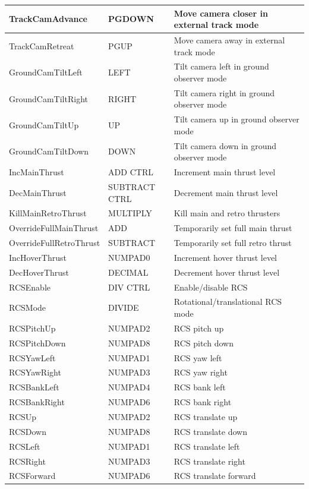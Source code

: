 \documentclass[Orbiter User Manual.tex]{subfiles}
\begin{document}
\begin{longtable}{ p{} p{} p{} }
	\hline
	TrackCamAdvance & PGDOWN & Move camera closer in external track mode\\
	\hline
	TrackCamRetreat & PGUP & Move camera away in external track mode\\
	\hline
	GroundCamTiltLeft & LEFT & Tilt camera left in ground observer mode\\
	\hline
	GroundCamTiltRight & RIGHT & Tilt camera right in ground observer mode\\
	\hline
	GroundCamTiltUp & UP & Tilt camera up in ground observer mode\\
	\hline
	GroundCamTiltDown & DOWN & Tilt camera down in ground observer mode\\
	\hline
	IncMainThrust & ADD CTRL & Increment main thrust level\\
	\hline
	DecMainThrust & SUBTRACT CTRL & Decrement main thrust level\\
	\hline
	KillMainRetroThrust & MULTIPLY & Kill main and retro thrusters\\
	\hline
	OverrideFullMainThrust & ADD & Temporarily set full main thrust\\
	\hline
	OverrideFullRetroThrust & SUBTRACT & Temporarily set full retro thrust\\
	\hline
	IncHoverThrust & NUMPAD0 & Increment hover thrust level\\
	\hline
	DecHoverThrust & DECIMAL & Decrement hover thrust level\\
	\hline
	RCSEnable & DIV CTRL & Enable/disable RCS\\
	\hline
	RCSMode & DIVIDE & Rotational/translational RCS mode\\
	\hline
	RCSPitchUp & NUMPAD2 & RCS pitch up\\
	\hline
	RCSPitchDown & NUMPAD8 & RCS pitch down\\
	\hline
	RCSYawLeft & NUMPAD1 & RCS yaw left\\
	\hline
	RCSYawRight & NUMPAD3 & RCS yaw right\\
	\hline
	RCSBankLeft & NUMPAD4 & RCS bank left\\
	\hline
	RCSBankRight & NUMPAD6 & RCS bank right\\
	\hline
	RCSUp & NUMPAD2 & RCS translate up\\
	\hline
	RCSDown & NUMPAD8 & RCS translate down\\
	\hline
	RCSLeft & NUMPAD1 & RCS translate left\\
	\hline
	RCSRight & NUMPAD3 & RCS translate right\\
	\hline
	RCSForward & NUMPAD6 & RCS translate forward\\

\end{longtable}
\end{document}
